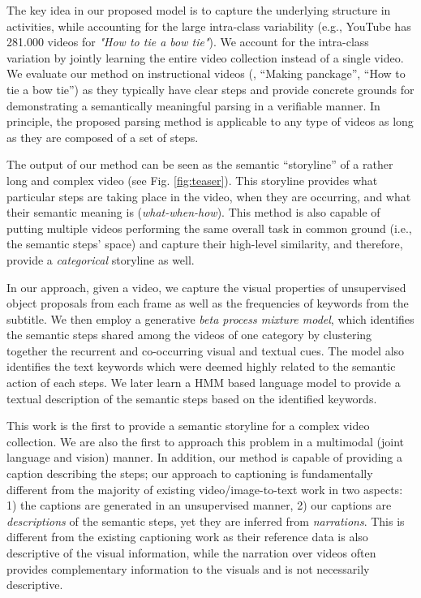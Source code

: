The key idea in our proposed model is to capture the underlying structure in activities, while accounting for the large intra-class variability (e.g., YouTube has 281.000 videos for \emph{"How to tie a bow tie"}). We account for the intra-class variation by jointly learning the entire video collection instead of a single video. We evaluate our method on instructional videos (\eg, ``Making panckage'', ``How to tie a bow tie'') as they typically have clear steps and provide concrete grounds for demonstrating a semantically meaningful parsing in a verifiable manner. In principle, the proposed parsing method is applicable to any type of videos as long as they are composed of a set of steps.

The output of our method can be seen as the semantic ``storyline'' of a rather long and complex video (see Fig. \ref{fig:teaser}). This storyline provides what particular steps are taking place in the video, when they are occurring, and what their semantic meaning is (\emph{what-when-how}). This method is also capable of putting multiple videos performing the same overall task in common ground (i.e., the semantic steps’ space) and capture their high-level similarity, and therefore, provide a \emph{categorical} storyline as well.

In our approach, given a video, we capture the visual properties of unsupervised object proposals from each frame as well as the frequencies of keywords from the subtitle. We then employ a generative \emph{beta process mixture model}, which identifies the semantic steps shared among the videos of one category by clustering together the recurrent and co-occurring visual and textual cues. The model also identifies the text keywords which were deemed highly related to the semantic action of each steps. We later learn a HMM based language model to provide a textual description of the semantic steps based on the identified keywords.

This work is the first to provide a semantic storyline for a complex video collection. We are also the first to approach this problem in a multimodal (joint language and vision) manner. In addition, our method is capable of providing a caption describing the steps; our approach to captioning is fundamentally different from the majority of existing video/image-to-text work in two aspects: 1) the captions are generated in an unsupervised manner, 2) our captions are \emph{descriptions} of the semantic steps, yet they are inferred from \emph{narrations}. This is different from the existing captioning work as their reference data is also descriptive of the visual information, while the narration over videos often provides complementary information to the visuals and is not necessarily descriptive.

